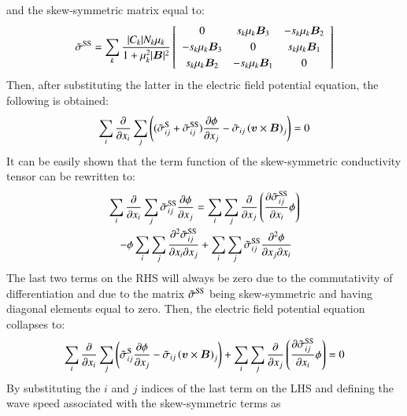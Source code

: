 \documentclass[twoside,9pt,twocolumn]{aiaa}
\newcommand{\alb}{\vspace{0.1cm}\\} %
\newcommand{\mfd}{\displaystyle}
\renewcommand{\vec}[1]{\bm{#1}}
\begin{document}
%
and the skew-symmetric matrix equal to:	
%
\begin{equation}
\wtilde{\sigma}^{\rm SS}=\sum_k \frac{|C_k| N_k \mu_k}{1+\mu_k^2|\vec{B}|^2} 
\left[\begin{array}{ccc}
0 
 & s_k \mu_k  \vec{B}_3
 & -s_k \mu_k   \vec{B}_2 \alb
-s_k \mu_k  \vec{B}_3
 & 0
 &  s_k \mu_k \vec{B}_1 \alb
s_k \mu_k \vec{B}_2 
 & -s_k \mu_k \vec{B}_1
 & 0
\end{array}
\right]
\end{equation}
%
Then, after substituting the latter in the electric field potential equation, the following is obtained:
%
\begin{equation}
  \sum_i \frac{\partial}{\partial x_i} \sum_j   \left((\wtilde{\sigma}_{ij}^{\rm S}+\wtilde{\sigma}_{ij}^{\rm SS})\frac{\partial \phi}{\partial x_j}  - \wtilde{\sigma}_{ij}\left(\vec{v} \times \vec{B}\right)_j\right) =0
\end{equation}
%
It can be easily shown that the term function of the skew-symmetric conductivity tensor can be rewritten to:
%
\begin{equation}
\begin{array}{l}
\mfd\sum_i \frac{\partial}{\partial x_i} \sum_j \wtilde{\sigma}_{ij}^{\rm SS} \frac{\partial \phi}{\partial x_j} = 
 \sum_i \sum_j     \frac{\partial }{\partial x_j}\left(\frac{\partial \wtilde{\sigma}_{ij}^{\rm SS}}{\partial x_i} \phi\right) \alb\mfd
~~~~
- \phi \sum_i \sum_j \frac{\partial^2 \wtilde{\sigma}_{ij}^{\rm SS}}{\partial x_i \partial x_j}    
+\sum_i \sum_j \wtilde{\sigma}_{ij}^{\rm SS}     \frac{\partial^2 \phi}{\partial x_j \partial x_i} 
\end{array}
\end{equation}
%
The last two terms on the RHS will always be zero due to the commutativity of differentiation and due to the matrix $\tilde{\sigma}^{\rm SS}$ being skew-symmetric and having diagonal elements equal to zero. Then, the electric field potential equation collapses to:
%
\begin{equation}
\sum_i \frac{\partial}{\partial x_i}   \sum_j   \left(\wtilde{\sigma}_{ij}^{\rm S}\frac{\partial \phi}{\partial x_j}  - \wtilde{\sigma}_{ij}\left(\vec{v} \times \vec{B}\right)_j\right) 
+ \sum_i \sum_j     \frac{\partial }{\partial x_j}\left(\frac{\partial \wtilde{\sigma}_{ij}^{\rm SS}}{\partial x_i} \phi\right) 
=0
\end{equation}
%
By substituting the $i$ and $j$ indices of the last term on the LHS and defining the wave speed associated with the skew-symmetric terms as
%
\end{document}
